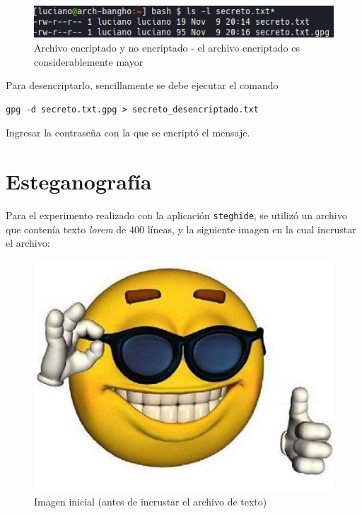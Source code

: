 \begin{figure}[H]
    \centering
    \includegraphics[width=\linewidth]{images/arys-tp3-pgp-simetrico.png}
    \caption*{Archivo encriptado y no encriptado - el archivo encriptado es considerablemente mayor}
\end{figure}

Para desencriptarlo, sencillamente se debe ejecutar el comando

\begin{lstlisting}
gpg -d secreto.txt.gpg > secreto_desencriptado.txt
\end{lstlisting}

Ingresar la contraseña con la que se encriptó el mensaje.


\section{Esteganografía}

Para el experimento realizado con la aplicación \texttt{steghide}, se utilizó un archivo que contenía texto \emph{lorem} de 400 líneas, y la siguiente imagen en la cual incrustar el archivo:

\begin{figure}[H]
    \centering
    \includegraphics[scale=0.5]{images/arys-tp3-picardia.jpg}
    \caption*{Imagen inicial (antes de incrustar el archivo de texto)}
\end{figure}

